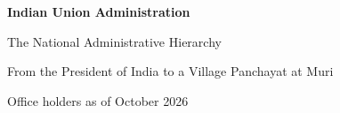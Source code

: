 \documentclass[12pt,a4paper,openany]{report}
\begin{document}
\begin{titlepage}
  \centering
  \vspace*{4.5cm}
  {\Huge\bfseries Indian Union Administration\par}
  \vspace{0.6cm}
  {\Large The National Administrative Hierarchy\par}
  \vspace{0.35cm}
  {\large From the President of India to a Village Panchayat at Muri\par}
  \vfill
  {\small Office holders as of October 2026\par}
\end{titlepage}

\end{document}

